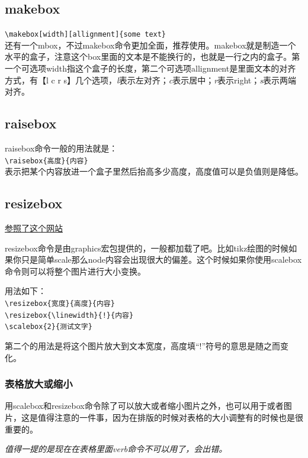 \documentclass[12pt,oneside]{book}
\begin{document}
\begin{common-format}
\subsection{makebox}
\verb+\makebox[width][allignment]{some text}+\\
还有一个mbox，不过makebox命令更加全面，推荐使用。makebox就是制造一个水平的盒子，注意这个box里面的文本是不能换行的，也就是一行之内的盒子。第一个可选项width指这个盒子的长度，第二个可选项allignment是里面文本的对齐方式，有【l c r s】几个选项，\emph{l}表示左对齐；\emph{c}表示居中；\emph{r}表示right；\emph{s}表示两端对齐。



\subsection{raisebox}
raisebox命令一般的用法就是：\\
\verb+\raisebox{高度}{内容}+\\
表示把某个内容放进一个盒子里然后抬高多少高度，高度值可以是负值则是降低。

\subsection{resizebox}
\href{http://tex.stackexchange.com/questions/13460/scalebox-knowing-how-much-it-scales}{参照了这个网站}

resizebox命令是由graphics宏包提供的，一般都加载了吧。比如tikz绘图的时候如果你只是简单scale那么node内容会出现很大的偏差。这个时候如果你使用scalebox命令则可以将整个图片进行大小变换。

用法如下：\\
\verb+\resizebox{宽度}{高度}{内容} +\\
\verb+\resizebox{\linewidth}{!}{内容}+\\
\verb+\scalebox{2}{测试文字}+

第二个的用法是将这个图片放大到文本宽度，高度填“!”符号的意思是随之而变化。


\subsubsection{表格放大或缩小}
用scalebox和resizebox命令除了可以放大或者缩小图片之外，也可以用于或者图片，这是值得注意的一件事，因为在排版的时候对表格的大小调整有的时候也是很重要的。

\emph{值得一提的是现在在表格里面verb命令不可以用了，会出错。}


\end{common-format}
\end{document}
